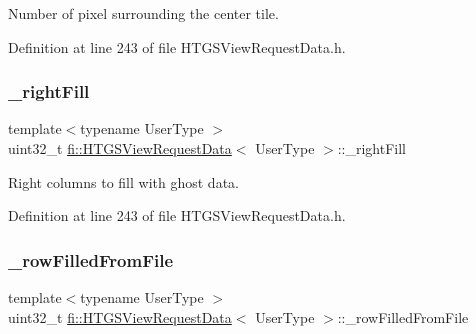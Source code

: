 Number of pixel surrounding the center tile. 



Definition at line 243 of file H\+T\+G\+S\+View\+Request\+Data.\+h.

\mbox{\label{classfi_1_1HTGSViewRequestData_ae020baac2a6c7c9c1d5c49460d27571f}} 
\subsubsection{\texorpdfstring{\+\_\+right\+Fill}{\_rightFill}}
{\footnotesize\ttfamily template$<$typename User\+Type $>$ \\
uint32\+\_\+t \hyperlink{classfi_1_1HTGSViewRequestData}{fi\+::\+H\+T\+G\+S\+View\+Request\+Data}$<$ User\+Type $>$\+::\+\_\+right\+Fill\hspace{0.3cm}{\ttfamily [private]}}



Right columns to fill with ghost data. 



Definition at line 243 of file H\+T\+G\+S\+View\+Request\+Data.\+h.

\mbox{\label{classfi_1_1HTGSViewRequestData_a0f7402345a2a1af6c042af8e57c48f13}} 
\subsubsection{\texorpdfstring{\+\_\+row\+Filled\+From\+File}{\_rowFilledFromFile}}
{\footnotesize\ttfamily template$<$typename User\+Type $>$ \\
uint32\+\_\+t \hyperlink{classfi_1_1HTGSViewRequestData}{fi\+::\+H\+T\+G\+S\+View\+Request\+Data}$<$ User\+Type $>$\+::\+\_\+row\+Filled\+From\+File\hspace{0.3cm}{\ttfamily [private]}}



